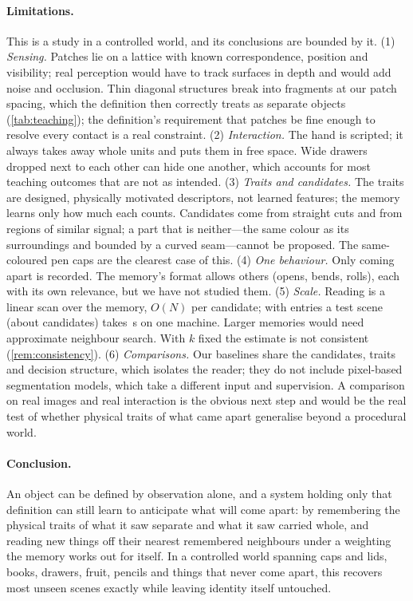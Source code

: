 \paragraph{Limitations.}
This is a study in a controlled world, and its conclusions are bounded by it.
(1) \emph{Sensing.} Patches lie on a lattice with known correspondence, position and visibility; real perception would have to track surfaces in depth and would add noise and occlusion. Thin diagonal structures break into fragments at our patch spacing, which the definition then correctly treats as separate objects (\cref{tab:teaching}); the definition's requirement that patches be fine enough to resolve every contact is a real constraint.
(2) \emph{Interaction.} The hand is scripted; it always takes away whole units and puts them in free space. Wide drawers dropped next to each other can hide one another, which accounts for most teaching outcomes that are not as intended.
(3) \emph{Traits and candidates.} The \nTraits{} traits are designed, physically motivated descriptors, not learned features; the memory learns only how much each counts. Candidates come from straight cuts and from regions of similar signal; a part that is neither---the same colour as its surroundings and bounded by a curved seam---cannot be proposed. The same-coloured pen caps are the clearest case of this.
(4) \emph{One behaviour.} Only coming apart is recorded. The memory's format allows others (opens, bends, rolls), each with its own relevance, but we have not studied them.
(5) \emph{Scale.} Reading is a linear scan over the memory, $O(N)$ per candidate; with \nEntries{} entries a test scene (about \candPerScene{} candidates) takes \secPerScene{}\,s on one machine. Larger memories would need approximate neighbour search. With $k$ fixed the estimate is not consistent (\cref{rem:consistency}).
(6) \emph{Comparisons.} Our baselines share the candidates, traits and decision structure, which isolates the reader; they do not include pixel-based segmentation models, which take a different input and supervision. A comparison on real images and real interaction is the obvious next step and would be the real test of whether physical traits of what came apart generalise beyond a procedural world.

\paragraph{Conclusion.}
An object can be defined by observation alone, and a system holding only that definition can still learn to anticipate what will come apart: by remembering the physical traits of what it saw separate and what it saw carried whole, and reading new things off their nearest remembered neighbours under a weighting the memory works out for itself. In a controlled world spanning caps and lids, books, drawers, fruit, pencils and things that never come apart, this recovers most unseen scenes exactly while leaving identity itself untouched.
